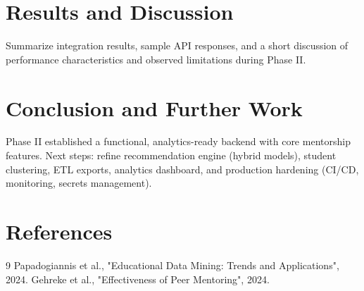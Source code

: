 \documentclass[12pt,singleside,a4paper]{article}
\begin{document}
\section{Results and Discussion}
Summarize integration results, sample API responses, and a short discussion of performance characteristics and observed limitations during Phase II.

\newpage

\section{Conclusion and Further Work}
Phase II established a functional, analytics-ready backend with core mentorship features. Next steps: refine recommendation engine (hybrid models), student clustering, ETL exports, analytics dashboard, and production hardening (CI/CD, monitoring, secrets management).

\newpage
\section*{References}
\begin{thebibliography}{9}
 Papadogiannis et al., "Educational Data Mining: Trends and Applications", 2024.
 Gehreke et al., "Effectiveness of Peer Mentoring", 2024.
\end{thebibliography}
\end{document}
